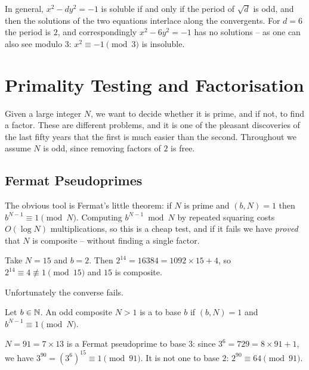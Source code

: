 \documentclass[a4paper]{scrartcl}
\begin{document}
\begin{remark}
	In general, $x^2 - dy^2 = -1$ is soluble if and only if the period of $\sqrt d$ is odd, and then the solutions of the two equations interlace along the convergents. For $d = 6$ the period is $2$, and correspondingly $x^2 - 6y^2 = -1$ has no solutions -- as one can also see modulo $3$: $x^2 \equiv -1 \pmod 3$ is insoluble.
\end{remark}

\section{Primality Testing and Factorisation}

Given a large integer $N$, we want to decide whether it is prime, and if not, to find a factor. These are different problems, and it is one of the pleasant discoveries of the last fifty years that the first is much easier than the second. Throughout we assume $N$ is odd, since removing factors of $2$ is free.

\subsection{Fermat Pseudoprimes}

The obvious tool is Fermat's little theorem: if $N$ is prime and $(b, N) = 1$ then $b^{N-1} \equiv 1 \pmod N$. Computing $b^{N-1} \bmod N$ by repeated squaring costs $O(\log N)$ multiplications, so this is a cheap test, and if it fails we have \emph{proved} that $N$ is composite -- without finding a single factor.

\begin{example}
	Take $N = 15$ and $b = 2$. Then $2^{14} = 16384 = 1092\times 15 + 4$, so $2^{14} \equiv 4 \not\equiv 1 \pmod{15}$ and $15$ is composite.
\end{example}

Unfortunately the converse fails.

\begin{definition}
	Let $b \in \mathbb{N}$. An odd composite $N > 1$ is a  to base $b$ if $(b, N) = 1$ and $b^{N-1}\equiv 1 \pmod N$.
\end{definition}

\begin{example}
	$N = 91 = 7\times13$ is a Fermat pseudoprime to base $3$: since $3^6 = 729 = 8\times91 + 1$, we have $3^{90} = (3^6)^{15} \equiv 1 \pmod{91}$. It is not one to base $2$: $2^{90} \equiv 64 \pmod{91}$.
\end{example}
\end{document}
